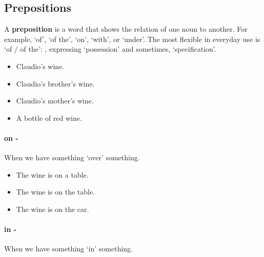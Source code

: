 \newpage

\subsection{Prepositions}
    A \textbf{preposition} is a word that shows the relation of one noun to another. 
    For example, `of', `of the', `on', `with', or `under'. The most flexible in everyday use is
    `of / of the': , expressing `possession' and sometimes, `specification'.

\begin{itemize}
    \item Claudio's wine. \\
    \item Claudio's brother's wine. \\
    \item Claudio's mother's wine. \\
    \item A bottle of red wine. \\
\end{itemize}

\paragraph{on - } When we have something `over' something.

\begin{itemize}
    \item The wine is on a table. \\
    \item The wine is on the table. \\
    \item The wine is on the car. \\
\end{itemize}

\paragraph{in - } When we have something `in' something.

